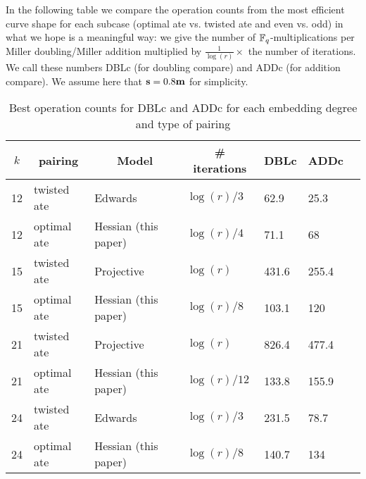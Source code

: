 In the following table we compare the operation counts from the most efficient 
curve shape for each subcase
(optimal ate vs. twisted ate and even vs. odd)
in what we hope is a meaningful way:
we give the number of $\mathbb{F}_{q}$-multiplications per Miller doubling/Miller addition multiplied by 
$\frac{1}{\log(r)} \times $ the number of iterations. We call these numbers DBLc 
(for doubling compare) and ADDc (for addition compare).
We assume here that $\textbf{s} = 0.8\textbf{m}$ for simplicity.

\begin{table}[h]
\centering
\caption{Best operation counts for DBLc and ADDc for each embedding degree and type of pairing}

\begin{tabular}{|l| l| l| l| l| l| l|}
\hline
\multicolumn{1}{|c|}{$k$}
&\multicolumn{1}{|c|}{pairing} 
&\multicolumn{1}{|c|}{Model}
&\multicolumn{1}{|c|}{\# iterations}
&\multicolumn{1}{|c|}{DBLc}	
&\multicolumn{1}{|c|}{ADDc}	
\\
\hline
12 & twisted ate & Edwards~\cite{2014/LWZ} & $\log(r)/3$ &
62.9 & 25.3 \\
12 & optimal ate & Hessian (this paper) & $\log(r)/4$ &
71.1 & 68 \\
\hline
15 & twisted ate & Projective~\cite{2009/craig} & $\log(r)$ &
431.6 & 255.4 \\
15 & optimal ate & Hessian (this paper) & $\log(r)/8$ &
103.1 & 120 \\
\hline
21 & twisted ate & Projective~\cite{2009/craig} & $\log(r)$ &
826.4 & 477.4 \\
21 & optimal ate & Hessian (this paper) & $\log(r)/12$ &
133.8 & 155.9 \\
\hline
24 & twisted ate & Edwards~\cite{2014/LWZ} & $\log(r)/3$ &
231.5 & 78.7 \\
24 & optimal ate & Hessian (this paper) & $\log(r)/8$ &
140.7 & 134 \\ \hline
\end{tabular}
\label{tbl-cmp1}
\end{table}

